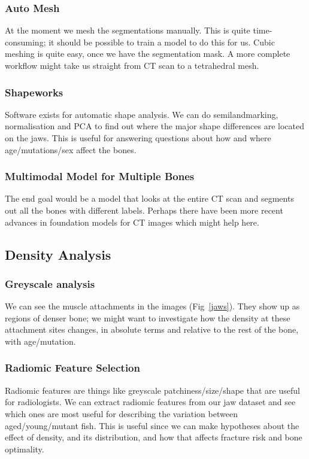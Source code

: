 \documentclass[12pt]{article}
\begin{document}
\subsubsection{Auto Mesh}
At the moment we mesh the segmentations manually.
This is quite time-consuming; it should be possible to train a model to do this for us.
Cubic meshing is quite easy, once we have the segmentation mask.
A more complete workflow might take us straight from CT scan to a tetrahedral mesh.

\subsubsection{Shapeworks}
Software exists for automatic shape analysis.
We can do semilandmarking, normalisation and PCA to find out where the major shape differences
are located on the jaws.
This is useful for answering questions about how and where age/mutations/sex affect the bones.

\subsubsection{Multimodal Model for Multiple Bones}
The end goal would be a model that looks at the entire CT scan and segments out all the bones
with different labels. Perhaps there have been more recent advances in foundation models for
CT images which might help here.

\subsection{Density Analysis}
\subsubsection{Greyscale analysis}
We can see the muscle attachments in the images (Fig~\ref{jaws}).
They show up as regions of denser bone; we might want to investigate how the density at these
attachment sites changes, in absolute terms and relative to the rest of the bone, with age/mutation.

\subsubsection{Radiomic Feature Selection}
Radiomic features are things like greyscale patchiness/size/shape that are useful for radiologists.
We can extract radiomic features from our jaw dataset and see which ones are most useful for describing
the variation between aged/young/mutant fish.
This is useful since we can make hypotheses about the effect of density, and its distribution, and how
that affects fracture risk and bone optimality.
\end{document}
